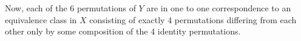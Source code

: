 \begin{enumerate}
    Now, each of the 6 permutations of $Y$ are in one to one correspondence to an equivalence class in $X$ consisting of exactly 4 permutations differing from each other only by some composition of the 4 identity permutations.
    
\end{enumerate}